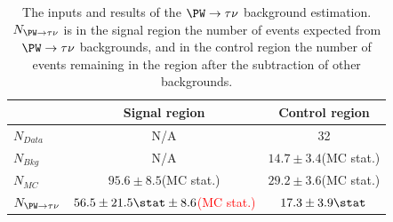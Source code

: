 \begin{table}
  \caption{The inputs and results of the $\PW\rightarrow \tau\nu$ background estimation. $N_{\PW\rightarrow \tau\nu}$ is in the signal region the number of events expected from $\PW\rightarrow \tau\nu$ backgrounds, and in the control region the number of events remaining in the region after the subtraction of other backgrounds.}
  \label{tab:promptwtaunu}
  \begin{tabular}{lcc}
    \hline
    \hline
    & Signal region & Control region \\
    \hline
    \hline
    $N_{Data}$ & N/A & 32\\
    $N_{Bkg}$ & N/A & $14.7\pm 3.4$(\ac{MC} stat.) \\
    $N_{MC}$& $95.6\pm 8.5$(\ac{MC} stat.) & $29.2\pm 3.6$(\ac{MC} stat.) \\
    \hline
    $N_{\PW\rightarrow \tau\nu}$& \textcolor{red}{$56.5\pm 21.5\stat\pm 8.6$(MC stat.)} & $17.3\pm 3.9 \stat$ \\
    \hline
    \hline
  \end{tabular}
\end{table}

